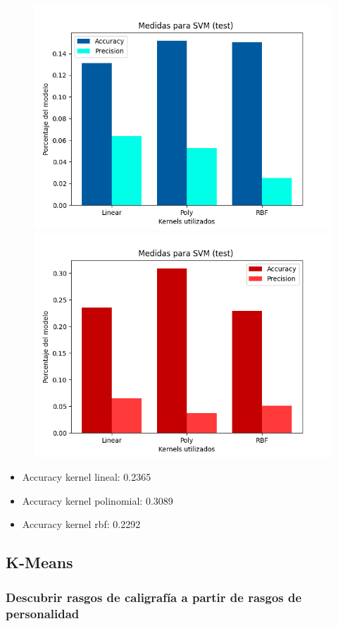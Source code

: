 \documentclass[10pt, a4paper]{article}
\begin{document}
            \begin{figure}[h!]
                \centering
                \includegraphics[width = 0.45\linewidth]{Medias_group.png}
                \includegraphics[width = 0.45\linewidth]{final_gruop.png}

            \end{figure}

            \begin{itemize}
                \item [] Accuracy kernel lineal: 0.2365
                \item [] Accuracy kernel polinomial: 0.3089
                \item [] Accuracy kernel rbf: 0.2292
            \end{itemize}
	
		\subsection{K-Means}
		
		\subsubsection{Descubrir rasgos de caligraf\'ia a partir de rasgos de personalidad}
		
\end{document}
